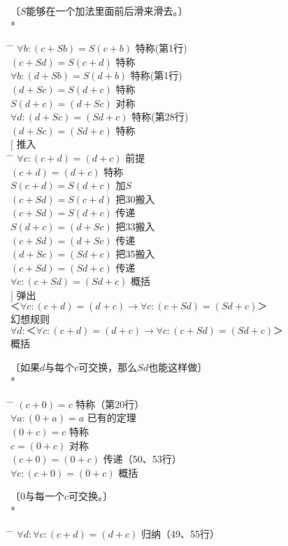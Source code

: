 \begin{center}
〔$S$能够在一个加法里面前后滑来滑去。〕\\
* \quad * \quad * \quad * \quad *
\end{center}
\begin{tabbing*}[]
\qquad\qquad \= \tabindent{-2em} \= \+\kill
$\forall b:(c+Sb)=S(c+b)$ \>特称(第1行)\\
$(c+Sd)=S(c+d)$ \>特称\\
$\forall b:(d+Sb)=S(d+b)$ \>特称(第1行)\\
$(d+Sc)=S(d+c)$ \>特称\\
$S(d+c)=(d+Sc)$ \>对称\\
$\forall d:(d+Sc)=(Sd+c)$ \>特称(第28行)\\
$(d+Sc)=(Sd+c)$ \>特称\\
$[$ \>推入\\
\pushtabs
  \quad \= \tabindent{-1em} \= \+\kill
  $\forall c:(c+d)=(d+c)$ \>前提\\
  $(c+d)=(d+c)$ \>特称\\
  $S(c+d)=S(d+c)$ \>加$S$\\
  $(c+Sd)=S(c+d)$ \>把30搬入\\
  $(c+Sd)=S(d+c)$ \>传递\\
  $S(d+c)=(d+Sc)$ \>把33搬入\\
  $(c+Sd)=(d+Sc)$ \>传递\\
  $(d+Sc)=(Sd+c)$ \>把35搬入\\
  $(c+Sd)=(Sd+c)$ \>传递\\
  $\forall c:(c+Sd)=(Sd+c)$ \>概括\-\\
\poptabs
$]$ \>弹出\\
$＜\forall c:(c+d)=(d+c)→\forall c:(c+Sd)=(Sd+c)＞$\\
  \>幻想规则\nonumber\\
$\forall d:＜\forall c:(c+d)=(d+c)→\forall c:(c+Sd)=(Sd+c)＞$\\
  \>概括\nonumber
\end{tabbing*}
\begin{center}
〔如果$d$与每个$c$可交换，那么$Sd$也能这样做〕\\
* \quad * \quad * \quad * \quad *
\end{center}
\begin{tabbing*}[]
\qquad\qquad \= \tabindent{-2em} \= \+\kill
$(c+0)=c$ \>特称（第20行）\\
$\forall a:(0+a)=a$ \>已有的定理\\
$(0+c)=c$ \>特称\\
$c=(0+c)$ \>对称\\
$(c+0)=(0+c)$ \>传递（50、53行）\\
$\forall c:(c+0)=(0+c)$ \>概括
\end{tabbing*}
\begin{center}
〔$0$与每一个$c$可交换。〕\\
* \quad * \quad * \quad * \quad *
\end{center}
\begin{tabbing*}[]
\qquad\qquad \= \tabindent{-2em} \= \+\kill
$\forall d:\forall c:(c+d)=(d+c)$ \>归纳（49、55行）
\end{tabbing*}


